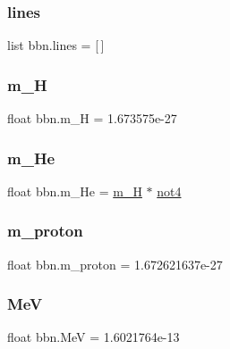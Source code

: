 \subsubsection{\texorpdfstring{lines}{lines}}
{\footnotesize\ttfamily list bbn.\+lines = \mbox{[}$\,$\mbox{]}}

\mbox{\label{namespacebbn_af144f84053152a233d6f7fe2f505589f}} 
\subsubsection{\texorpdfstring{m\+\_\+H}{m\_H}}
{\footnotesize\ttfamily float bbn.\+m\+\_\+H = 1.\+673575e-\/27}

\mbox{\label{namespacebbn_a5659e9c09b2847f14bb66c2d73e68191}} 
\subsubsection{\texorpdfstring{m\+\_\+\+He}{m\_He}}
{\footnotesize\ttfamily float bbn.\+m\+\_\+\+He = \mbox{\hyperlink{namespacebbn_af144f84053152a233d6f7fe2f505589f}{m\+\_\+H}} $\ast$ \mbox{\hyperlink{namespacebbn_a9ea8fb09e803dade7572cbbf146631cc}{not4}}}

\mbox{\label{namespacebbn_ac02aae5f2251db3c9b740d288330595d}} 
\subsubsection{\texorpdfstring{m\+\_\+proton}{m\_proton}}
{\footnotesize\ttfamily float bbn.\+m\+\_\+proton = 1.\+672621637e-\/27}

\mbox{\label{namespacebbn_a3a99f29ae890693870353fa67b0b034c}} 
\subsubsection{\texorpdfstring{MeV}{MeV}}
{\footnotesize\ttfamily float bbn.\+MeV = 1.\+6021764e-\/13}

\mbox{\label{namespacebbn_a2de37c27807dd57d0dbea68a4f3992fa}} 
